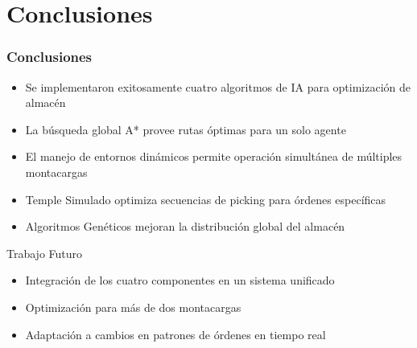 \documentclass[aspectratio=169]{beamer}
\begin{document}
\section{Conclusiones}

\begin{frame}
    \frametitle{Conclusiones}
    \begin{itemize}
        \item Se implementaron exitosamente cuatro algoritmos de IA para optimización de almacén
        \item La búsqueda global A* provee rutas óptimas para un solo agente
        \item El manejo de entornos dinámicos permite operación simultánea de múltiples montacargas
        \item Temple Simulado optimiza secuencias de picking para órdenes específicas
        \item Algoritmos Genéticos mejoran la distribución global del almacén
    \end{itemize}
    
    \vspace{0.3cm}
    \begin{block}{Trabajo Futuro}
        \begin{itemize}
            \item Integración de los cuatro componentes en un sistema unificado
            \item Optimización para más de dos montacargas
            \item Adaptación a cambios en patrones de órdenes en tiempo real
        \end{itemize}
    \end{block}
\end{frame}
\end{document}
